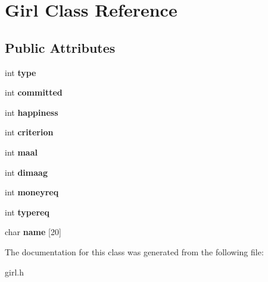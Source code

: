 \section{Girl Class Reference}
\label{class_girl}
\subsection*{Public Attributes}
\begin{DoxyCompactItemize}
\item 
\mbox{\label{class_girl_ac0242bb0ae7c23f69a75537437f76586}} 
int {\bfseries type}
\item 
\mbox{\label{class_girl_ac5829e7ec762f1a3fb7484acfd6c1680}} 
int {\bfseries committed}
\item 
\mbox{\label{class_girl_a50337447735a8f518fd817338d04d5b9}} 
int {\bfseries happiness}
\item 
\mbox{\label{class_girl_a1a2a395adc6fdf036a4487892ea4cebb}} 
int {\bfseries criterion}
\item 
\mbox{\label{class_girl_a8ecede744e8a924ce3a494fc46ede6f8}} 
int {\bfseries maal}
\item 
\mbox{\label{class_girl_a2d7c2a5ac9040a564ef26c3b5c7b7a11}} 
int {\bfseries dimaag}
\item 
\mbox{\label{class_girl_a990d3b0cf6616c70e757ab3690d65363}} 
int {\bfseries moneyreq}
\item 
\mbox{\label{class_girl_aecbaa1656f8966351f6589b72be593eb}} 
int {\bfseries typereq}
\item 
\mbox{\label{class_girl_a61040f5e25bf1f8135eaebf24875fe67}} 
char {\bfseries name} [20]
\end{DoxyCompactItemize}


The documentation for this class was generated from the following file\+:\begin{DoxyCompactItemize}
\item 
girl.\+h\end{DoxyCompactItemize}

